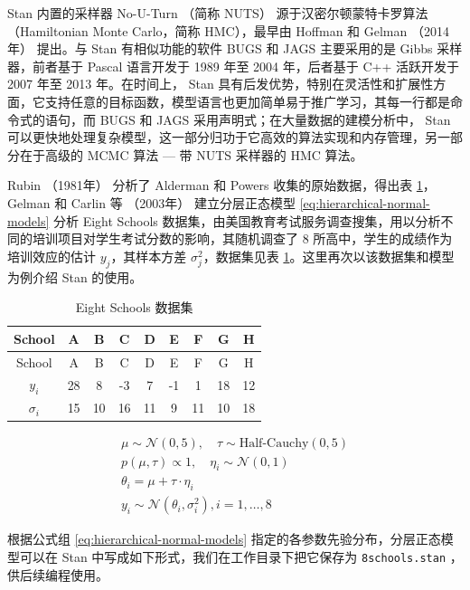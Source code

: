\documentclass[12pt,a4paper,UTF8,twoside]{book}
\theoremstyle{definition}
\theoremstyle{definition}
\theoremstyle{definition}
\theoremstyle{remark}
\begin{document}
Stan 内置的采样器 No-U-Turn （简称 NUTS） 源于汉密尔顿蒙特卡罗算法
（Hamiltonian Monte Carlo，简称 HMC），最早由 Hoffman 和 Gelman
（2014年） \citep{hoffman2014} 提出。与 Stan 有相似功能的软件 BUGS 和
JAGS 主要采用的是 Gibbs 采样器，前者基于 Pascal 语言开发于 1989 年至
2004 年，后者基于 C++ 活跃开发于 2007 年至 2013 年。在时间上， Stan
具有后发优势，特别在灵活性和扩展性方面，它支持任意的目标函数，模型语言也更加简单易于推广学习，其每一行都是命令式的语句，而
BUGS 和 JAGS 采用声明式；在大量数据的建模分析中， Stan
可以更快地处理复杂模型，这一部分归功于它高效的算法实现和内存管理，另一部分在于高级的
MCMC 算法 --- 带 NUTS 采样器的 HMC 算法。

Rubin （1981年） \citep{Rubin1981} 分析了 Alderman 和 Powers
\citep{Alderman1980} 收集的原始数据，得出表
\ref{tab:eight-high-schools}， Gelman 和 Carlin 等 （2003年）
\citep{Gelman2003} 建立分层正态模型 \eqref{eq:hierarchical-normal-models}
分析 Eight Schools
数据集，由美国教育考试服务调查搜集，用以分析不同的培训项目对学生考试分数的影响，其随机调查了
8 所高中，学生的成绩作为培训效应的估计 \(y_j\)，其样本方差
\(\sigma^2_j\)，数据集见表
\ref{tab:eight-high-schools}。这里再次以该数据集和模型为例介绍 Stan
的使用。

\begin{longtable}[]{@{}ccccccccc@{}}
\caption{\label{tab:eight-high-schools} Eight Schools 数据集}\tabularnewline
\toprule
School & A & B & C & D & E & F & G & H\tabularnewline
\midrule
\endfirsthead
\toprule
School & A & B & C & D & E & F & G & H\tabularnewline
\midrule
\endhead
\(y_i\) & 28 & 8 & -3 & 7 & -1 & 1 & 18 & 12\tabularnewline
\(\sigma_i\) & 15 & 10 & 16 & 11 & 9 & 11 & 10 & 18\tabularnewline
\bottomrule
\end{longtable}

\begin{equation}
\begin{aligned}
    \mu \sim \mathcal{N}(0,5), \quad \tau \sim \text{Half-Cauchy}(0,5) \\
    p(\mu,\tau) \propto 1, \quad \eta_i \sim \mathcal{N}(0,1) \\
    \theta_i  =   \mu + \tau \cdot \eta_i \\
    y_i \sim \mathcal{N}(\theta_i,\sigma^2_{i}), i = 1,\ldots,8
\end{aligned}
\label{eq:hierarchical-normal-models}
\end{equation}

根据公式组 \eqref{eq:hierarchical-normal-models}
指定的各参数先验分布，分层正态模型可以在 Stan
中写成如下形式，我们在工作目录下把它保存为 \texttt{8schools.stan}
，供后续编程使用。
\end{document}
